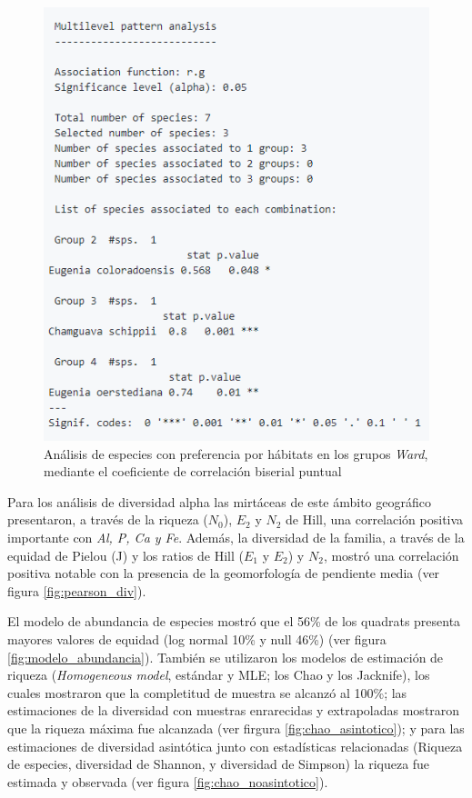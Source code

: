 \documentclass[11pt,]{article}
\begin{document}
\begin{figure}
\centering
\includegraphics{rg_analisis.png}
\caption{Análisis de especies con preferencia por hábitats en los grupos
\emph{Ward}, mediante el coeficiente de correlación biserial puntual
\label{fig:rg_analisis}}
\end{figure}

Para los análisis de diversidad alpha las mirtáceas de este ámbito
geográfico presentaron, a través de la riqueza (\(N_0\)), \(E_2\) y
\(N_2\) de Hill, una correlación positiva importante con \emph{Al, P, Ca
y Fe}. Además, la diversidad de la familia, a través de la equidad de
Pielou (J) y los ratios de Hill (\(E_1\) y \(E_2\)) y \(N_2\), mostró
una correlación positiva notable con la presencia de la geomorfología de
pendiente media (ver figura \ref{fig:pearson_div}).

El modelo de abundancia de especies mostró que el 56\% de los quadrats
presenta mayores valores de equidad (log normal 10\% y null 46\%) (ver
figura \ref{fig:modelo_abundancia}). También se utilizaron los modelos
de estimación de riqueza (\emph{Homogeneous model}, estándar y MLE; los
Chao y los Jacknife), los cuales mostraron que la completitud de muestra
se alcanzó al 100\%; las estimaciones de la diversidad con muestras
enrarecidas y extrapoladas mostraron que la riqueza máxima fue alcanzada
(ver firgura \ref{fig:chao_asintotico}); y para las estimaciones de
diversidad asintótica junto con estadísticas relacionadas (Riqueza de
especies, diversidad de Shannon, y diversidad de Simpson) la riqueza fue
estimada y observada (ver figura \ref{fig:chao_noasintotico}).
\end{document}
